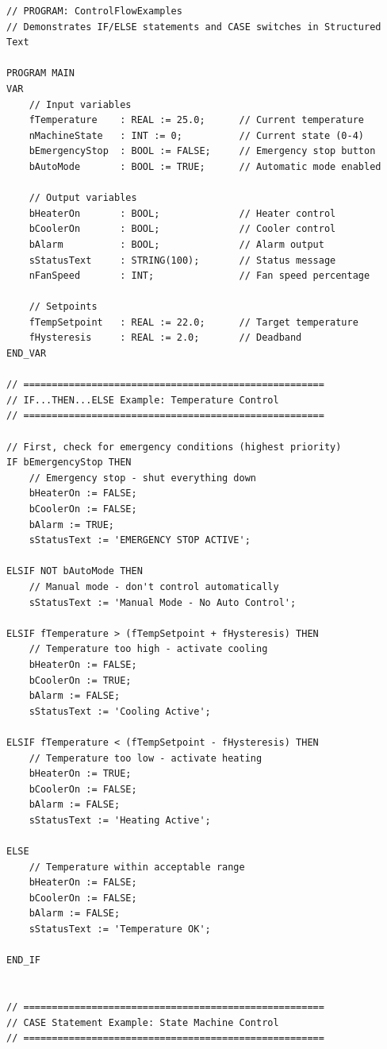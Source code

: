 \documentclass[11pt,a4paper]{article}
\begin{document}
\begin{lstlisting}
// PROGRAM: ControlFlowExamples
// Demonstrates IF/ELSE statements and CASE switches in Structured Text

PROGRAM MAIN
VAR
    // Input variables
    fTemperature    : REAL := 25.0;      // Current temperature
    nMachineState   : INT := 0;          // Current state (0-4)
    bEmergencyStop  : BOOL := FALSE;     // Emergency stop button
    bAutoMode       : BOOL := TRUE;      // Automatic mode enabled
    
    // Output variables
    bHeaterOn       : BOOL;              // Heater control
    bCoolerOn       : BOOL;              // Cooler control
    bAlarm          : BOOL;              // Alarm output
    sStatusText     : STRING(100);       // Status message
    nFanSpeed       : INT;               // Fan speed percentage
    
    // Setpoints
    fTempSetpoint   : REAL := 22.0;      // Target temperature
    fHysteresis     : REAL := 2.0;       // Deadband
END_VAR

// =====================================================
// IF...THEN...ELSE Example: Temperature Control
// =====================================================

// First, check for emergency conditions (highest priority)
IF bEmergencyStop THEN
    // Emergency stop - shut everything down
    bHeaterOn := FALSE;
    bCoolerOn := FALSE;
    bAlarm := TRUE;
    sStatusText := 'EMERGENCY STOP ACTIVE';
    
ELSIF NOT bAutoMode THEN
    // Manual mode - don't control automatically
    sStatusText := 'Manual Mode - No Auto Control';
    
ELSIF fTemperature > (fTempSetpoint + fHysteresis) THEN
    // Temperature too high - activate cooling
    bHeaterOn := FALSE;
    bCoolerOn := TRUE;
    bAlarm := FALSE;
    sStatusText := 'Cooling Active';
    
ELSIF fTemperature < (fTempSetpoint - fHysteresis) THEN
    // Temperature too low - activate heating
    bHeaterOn := TRUE;
    bCoolerOn := FALSE;
    bAlarm := FALSE;
    sStatusText := 'Heating Active';
    
ELSE
    // Temperature within acceptable range
    bHeaterOn := FALSE;
    bCoolerOn := FALSE;
    bAlarm := FALSE;
    sStatusText := 'Temperature OK';
    
END_IF


// =====================================================
// CASE Statement Example: State Machine Control
// =====================================================


\end{lstlisting}
\end{document}
